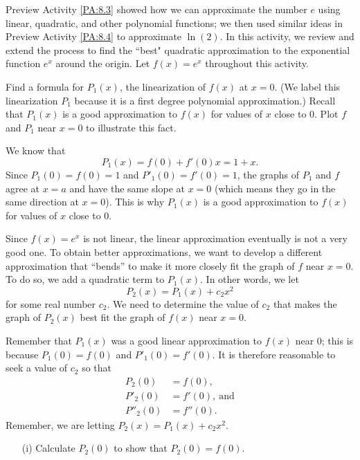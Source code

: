 \begin{pa} \label{PA:8.5}
Preview Activity \ref{PA:8.3} showed how we can approximate the number $e$ using linear, quadratic, and other polynomial functions; we then used similar ideas in Preview Activity \ref{PA:8.4} to approximate $\ln(2)$. In this activity, we review and extend the process to find the ``best" quadratic approximation to the exponential function $e^x$ around the origin. Let $f(x) = e^x$ throughout this activity.

\ba
\item Find a formula for $P_1(x)$, the linearization of $f(x)$ at $x=0$.  (We label this linearization $P_1$ because it is a first degree polynomial approximation.) Recall that $P_1(x)$ is a good approximation to $f(x)$ for values of $x$ close to $0$. Plot $f$ and $P_1$ near $x=0$ to illustrate this fact.

\begin{activitySolution}

We know that
\[P_1(x) = f(0) + f'(0)x = 1+x.\]
Since $P_1(0) = f(0) = 1$ and $P'_1(0) = f'(0) = 1$, the graphs of $P_1$ and $f$ agree at $x=a$ and have the same slope at $x=0$ (which means they go in the same direction at $x=0$). This is why $P_1(x)$ is a good approximation to $f(x)$ for values of $x$ close to $0$.

\end{activitySolution}

\item Since $f(x) = e^x$ is not linear, the linear approximation eventually is not a very good one. To obtain better approximations, we want to develop a different approximation that ``bends'' to make it more closely fit the graph of $f$ near $x=0$. To do so, we  add a quadratic term to $P_1(x)$. In other words, we let
\[P_2(x) = P_1(x) + c_2x^2\]
for some real number $c_2$. We need to determine the value  of $c_2$ that makes the graph of $P_2(x)$ best fit the graph of $f(x)$ near $x=0$.

Remember that $P_1(x)$ was a good linear approximation to $f(x)$ near $0$; this is because $P_1(0) = f(0)$ and $P'_1(0) = f'(0)$. It is therefore reasonable to seek a value of $c_2$ so that
\begin{align*}
P_2(0) &= f(0), \\
P'_2(0) &= f'(0), \ \mbox{and} \\
P''_2(0) &= f''(0).
\end{align*}
Remember, we are letting $P_2(x) = P_1(x) + c_2x^2$.
    \begin{itemize}     	
	\item[(i)] Calculate $P_2(0)$ to show that $P_2(0) = f(0)$.


\end{itemize}
\end{pa}
